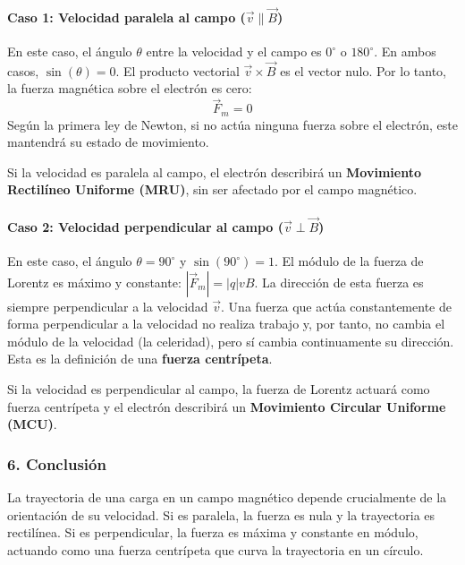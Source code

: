 \paragraph{Caso 1: Velocidad paralela al campo ($\vec{v} \parallel \vec{B}$)}
En este caso, el ángulo $\theta$ entre la velocidad y el campo es $0^\circ$ o $180^\circ$. En ambos casos, $\sin(\theta) = 0$.
El producto vectorial $\vec{v} \times \vec{B}$ es el vector nulo. Por lo tanto, la fuerza magnética sobre el electrón es cero:
$$ \vec{F}_m = 0 $$
Según la primera ley de Newton, si no actúa ninguna fuerza sobre el electrón, este mantendrá su estado de movimiento.
\begin{cajaresultado}
Si la velocidad es paralela al campo, el electrón describirá un \textbf{Movimiento Rectilíneo Uniforme (MRU)}, sin ser afectado por el campo magnético.
\end{cajaresultado}

\paragraph{Caso 2: Velocidad perpendicular al campo ($\vec{v} \perp \vec{B}$)}
En este caso, el ángulo $\theta=90^\circ$ y $\sin(90^\circ)=1$. El módulo de la fuerza de Lorentz es máximo y constante: $|\vec{F}_m| = |q|vB$.
La dirección de esta fuerza es siempre perpendicular a la velocidad $\vec{v}$. Una fuerza que actúa constantemente de forma perpendicular a la velocidad no realiza trabajo y, por tanto, no cambia el módulo de la velocidad (la celeridad), pero sí cambia continuamente su dirección. Esta es la definición de una \textbf{fuerza centrípeta}.
\begin{cajaresultado}
Si la velocidad es perpendicular al campo, la fuerza de Lorentz actuará como fuerza centrípeta y el electrón describirá un \textbf{Movimiento Circular Uniforme (MCU)}.
\end{cajaresultado}

\subsubsection*{6. Conclusión}
\begin{cajaconclusion}
La trayectoria de una carga en un campo magnético depende crucialmente de la orientación de su velocidad. Si es paralela, la fuerza es nula y la trayectoria es rectilínea. Si es perpendicular, la fuerza es máxima y constante en módulo, actuando como una fuerza centrípeta que curva la trayectoria en un círculo.
\end{cajaconclusion}

